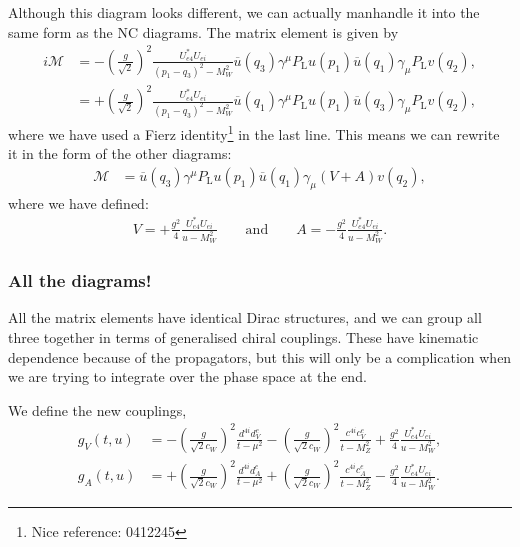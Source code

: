 \documentclass[11pt, a4paper]{article}
\begin{document}
Although this diagram looks different, we can actually manhandle it into the same form 
as the NC diagrams. The matrix element is given by
%
\begin{align*}
%
i\mathcal{M} &= -\left(\frac{g}{\sqrt{2}}\right)^2\frac{U^*_{e4}U_{ei}}{(p_1-q_3)^2-M_W^2} \overline{u}(q_3)\gamma^\mu
P_\text{L} u(p_1) \overline{u}(q_1)\gamma_\mu P_\text{L}
v(q_2), \\ 
%
&= +\left(\frac{g}{\sqrt{2}}\right)^2\frac{U^*_{e4}U_{ei}}{(p_1-q_3)^2-M_W^2} \overline{u}(q_1)\gamma^\mu
P_\text{L} u(p_1) \overline{u}(q_3)\gamma_\mu P_\text{L} v(q_2),
%
\end{align*}
%
where we have used a Fierz identity\footnote{Nice reference: 0412245} in the last line.
%
This means we can rewrite it in the form of the other diagrams:
%
\begin{align*}
%
\mathcal{M} &= \overline{u}(q_3)\gamma^\mu P_\text{L} u(p_1) \overline{u}(q_1)\gamma_\mu\left(V+ A\right)v(q_2),
%
\end{align*}
%
where we have defined:
%
\begin{align*}
%
V = +\frac{g^2}{4}\frac{U^*_{e4}U_{ei}}{u-M_W^2} \qquad\text{and}\qquad A = - \frac{g^2}{4}\frac{U^*_{e4}U_{ei}}{u-M_W^2}.
%
\end{align*}
%
%
%
%

\subsubsection{All the diagrams!}

All the matrix elements have identical Dirac structures, and we can group all
three together in terms of generalised chiral couplings. These have kinematic
dependence because of the propagators, but this will only be a complication
when we are trying to integrate over the phase space at the end.
%

We define the new couplings, 
%
\begin{align*}
%
g_V(t,u) &=  -\left(\frac{g}{\sqrt{2}c_W}\right)^2\frac{d^{4i}d^e_V}{t-\mu^2} -\left(\frac{g}{\sqrt{2}c_W}\right)^2\frac{c^{4i}c^e_V}{t-M_Z^2} +\frac{g^2}{4}\frac{U^*_{e4}U_{ei}}{u-M_W^2},\\ 
%
g_A(t,u) &=  +\left(\frac{g}{\sqrt{2}c_W}\right)^2\frac{d^{4i}d^e_A}{t-\mu^2} +\left(\frac{g}{\sqrt{2}c_W}\right)^2\frac{c^{4i}c^e_A}{t-M_Z^2} -\frac{g^2}{4}\frac{U^*_{e4}U_{ei}}{u-M_W^2}. 
%
\end{align*}
%
\end{document}
